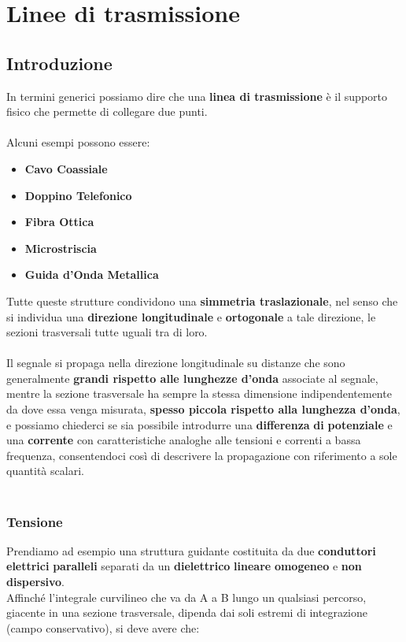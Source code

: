 \chapter{Linee di trasmissione}
\section{Introduzione}

In termini generici possiamo dire che una \textbf{linea di trasmissione} è il supporto fisico che permette di collegare due punti.\\ \\
Alcuni esempi possono essere:
\begin{itemize}
    \item \textbf{Cavo Coassiale}
    \item \textbf{Doppino Telefonico}
    \item \textbf{Fibra Ottica}
    \item \textbf{Microstriscia}
    \item \textbf{Guida d'Onda Metallica}
\end{itemize}
Tutte queste strutture condividono una \textbf{simmetria traslazionale}, nel senso che si individua una \textbf{direzione longitudinale} e
\textbf{ortogonale} a tale direzione, le sezioni trasversali tutte uguali tra di loro.\\ \\
Il segnale si propaga nella direzione longitudinale su distanze
che sono generalmente \textbf{grandi rispetto alle lunghezze d'onda} associate al
segnale, mentre la sezione trasversale ha sempre la stessa dimensione indipendentemente da dove essa venga misurata,
\textbf{spesso piccola rispetto alla lunghezza d'onda}, e possiamo chiederci se sia possibile introdurre una \textbf{differenza} 
\textbf{di} \textbf{potenziale} e una \textbf{corrente} con caratteristiche analoghe alle tensioni e correnti a bassa frequenza, consentendoci così di descrivere la propagazione con riferimento a sole quantità scalari.\\ \\

\subsection{Tensione}
Prendiamo ad esempio una struttura guidante costituita da due \textbf{conduttori} \textbf{elettrici} \textbf{paralleli} separati da un \textbf{dielettrico} \textbf{lineare} \textbf{omogeneo} e \textbf{non} \textbf{dispersivo}.\\  
Affinché l'integrale curvilineo che va da A a B lungo un qualsiasi percorso, giacente in una sezione trasversale, dipenda dai soli estremi di integrazione (campo conservativo), si deve avere che:

